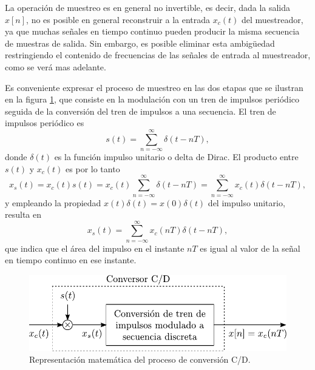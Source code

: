 \documentclass[a4paper]{report}
\begin{document}
La operación de muestreo es en general no invertible, es decir, dada la salida \(x[n]\), no es posible en general reconstruir a la entrada \(x_c(t)\) del muestreador, ya que muchas señales en tiempo continuo pueden producir la misma secuencia de muestras de salida. Sin embargo, es posible eliminar esta ambigüedad restringiendo el contenido de frecuencias de las señales de entrada al muestreador, como se verá mas adelante. 

Es conveniente expresar el proceso de muestreo en las dos etapas que se ilustran en la figura \ref{fig:sampling_continous_discrete_converter_block_diagram}, que consiste en la modulación con un tren de impulsos periódico seguida de la conversión del tren de impulsos a una secuencia. El tren de impulsos periódico es
\[
 s(t)=\sum_{n=-\infty}^\infty\delta(t-nT),
\]
donde \(\delta(t)\) es la función impulso unitario o delta de Dirac. El producto entre \(s(t)\) y \(x_c(t)\) es por lo tanto
\[
 x_s(t)=x_c(t)s(t)=x_c(t)\sum_{n=-\infty}^\infty\delta(t-nT)=\sum_{n=-\infty}^\infty x_c(t)\delta(t-nT),
\]
y empleando la propiedad \(x(t)\delta(t)=x(0)\delta(t)\) del impulso unitario, resulta en
\begin{equation}\label{eq:sampling_xs_modulated_impulse_train}
 x_s(t)=\sum_{n=-\infty}^\infty x_c(nT)\delta(t-nT), 
\end{equation}
que indica que el área del impulso en el instante \(nT\) es igual al valor de la señal en tiempo continuo en ese instante.
\begin{figure}[!htb]
  \begin{minipage}[c]{0.59\textwidth}
    \includegraphics[width=\textwidth]{figuras/sampling_continous_discrete_converter_block_diagram.pdf}
  \end{minipage}\hfill
  \begin{minipage}[c]{0.31\textwidth}
    \caption{
     Representación matemática del proceso de conversión C/D.
    }\label{fig:sampling_continous_discrete_converter_block_diagram}
  \end{minipage}
\end{figure}
\end{document}
